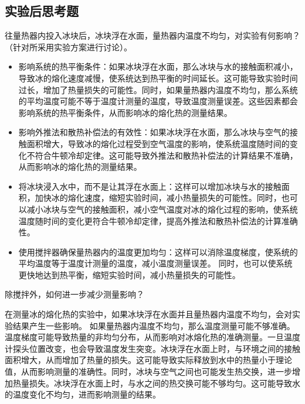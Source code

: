\documentclass[dvipsnames, svgnames,a4paper,11pt]{article}
\begin{document}
	\subsection{实验后思考题}
	\begin{question}
		往量热器内投入冰块后，冰块浮在水面，量热器内温度不均匀，对实验有何影响？（针对所采用实验方案进行讨论）。
	\end{question}
	\begin{itemize}
		\item 影响系统的热平衡条件：如果冰块浮在水面，那么冰块与水的接触面积减小，导致冰的熔化速度减慢，使系统达到热平衡的时间延长。这可能导致实验时间过长，增加了热量损失的可能性。同时，如果量热器内温度不均匀，那么系统的平均温度可能不等于温度计测量的温度，导致温度测量误差。这些因素都会影响系统的热平衡条件，从而影响冰的熔化热的测量结果。
		
		\item 影响外推法和散热补偿法的有效性：如果冰块浮在水面，那么冰块与空气的接触面积增大，导致冰的熔化过程受到空气温度的影响，使系统温度随时间的变化不符合牛顿冷却定律。这可能导致外推法和散热补偿法的计算结果不准确，从而影响冰的熔化热的测量结果。
		
		\item 将冰块浸入水中，而不是让其浮在水面上：这样可以增加冰块与水的接触面积，加快冰的熔化速度，缩短实验时间，减小热量损失的可能性。同时，也可以减小冰块与空气的接触面积，减小空气温度对冰的熔化过程的影响，使系统温度随时间的变化更符合牛顿冷却定律，提高外推法和散热补偿法的计算准确性。
		
		\item 使用搅拌器确保量热器内的温度更加均匀：这样可以消除温度梯度，使系统的平均温度等于温度计测量的温度，减小温度测量误差。
		同时，也可以使系统更快地达到热平衡，缩短实验时间，减小热量损失的可能性。
		
	\end{itemize}
	
	\begin{question}
		除搅拌外，如何进一步减少测量影响？
	\end{question}
	在测量冰的熔化热的实验中，如果冰块浮在水面并且量热器内温度不均匀，会对实验结果产生一些影响。
	如果量热器内温度不均匀，那么温度测量可能不够准确。温度梯度可能导致热量的非均匀分布，从而影响对冰熔化热的准确测量。一旦温度计探头位置改变，也会导致温度发生突变。冰块浮在水面上时，与环境之间的接触面积增大，从而增加了热量的损失。这可能导致实际释放到水中的热量小于理论值，从而影响测量的准确性。同时，冰块与空气之间也可能发生热交换，进一步增加热量损失。冰块浮在水面上时，与水之间的热交换可能不够均匀。这可能导致水的温度变化不均匀，进而影响测量的结果。
	
\end{document}
